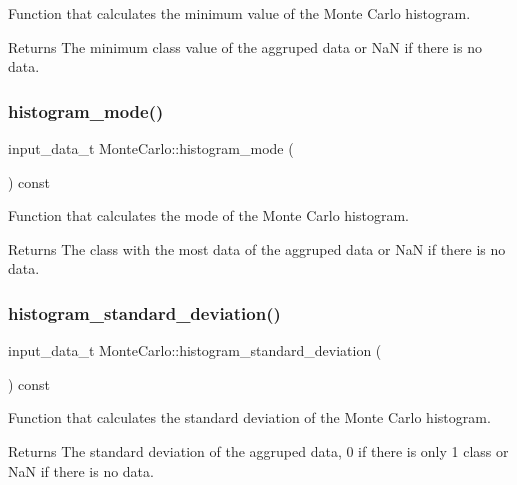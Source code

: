 Function that calculates the minimum value of the Monte Carlo histogram. \begin{DoxyReturn}{Returns}
The minimum class value of the aggruped data or NaN if there is no data. 
\end{DoxyReturn}
\mbox{\label{classMonteCarlo_aad9154200dcbb94c5ddd15c98e38f08d}} 
\subsubsection{\texorpdfstring{histogram\+\_\+mode()}{histogram\_mode()}}
{\footnotesize\ttfamily input\+\_\+data\+\_\+t Monte\+Carlo\+::histogram\+\_\+mode (\begin{DoxyParamCaption}{ }\end{DoxyParamCaption}) const}

Function that calculates the mode of the Monte Carlo histogram. \begin{DoxyReturn}{Returns}
The class with the most data of the aggruped data or NaN if there is no data. 
\end{DoxyReturn}
\mbox{\label{classMonteCarlo_a444d97838d7f3f04cbbaf11d2f514887}} 
\subsubsection{\texorpdfstring{histogram\+\_\+standard\+\_\+deviation()}{histogram\_standard\_deviation()}}
{\footnotesize\ttfamily input\+\_\+data\+\_\+t Monte\+Carlo\+::histogram\+\_\+standard\+\_\+deviation (\begin{DoxyParamCaption}{ }\end{DoxyParamCaption}) const}

Function that calculates the standard deviation of the Monte Carlo histogram. \begin{DoxyReturn}{Returns}
The standard deviation of the aggruped data, 0 if there is only 1 class or NaN if there is no data. 
\end{DoxyReturn}
\mbox{\label{classMonteCarlo_a06304df8a3012e772db198f6338ebc51}} 
